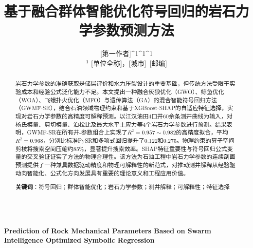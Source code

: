 \documentclass[a4paper,12pt]{ctexart}
\begin{document}
\title{\LARGE\textbf{基于融合群体智能优化符号回归的岩石力学参数预测方法}}
\author{
  {[第一作者]}^{1}\quad {[第二作者]}^{1}\quad {[第三作者]}^{1} \\[6pt]
  \small $^{1}$ [单位全称]，[城市]~[邮编]
}
\date{}
\maketitle

\begin{abstract}
岩石力学参数的准确获取是储层评价和水力压裂设计的重要基础，但传统方法受限于实验成本和经验公式泛化能力不足。本文提出一种融合灰狼优化（GWO）、鲸鱼优化（WOA）、飞蛾扑火优化（MFO）与遗传算法（GA）的混合智能符号回归方法（GWMF-SR），结合石油领域物理约束和基于XGBoost-SHAP的自适应特征选择，实现对岩石力学参数的高精度可解释预测。以江汉油田4口井60余条测井曲线为输入，对杨氏模量、剪切模量、泊松比及最大水平主应力等4个岩石力学参数进行预测。结果表明，GWMF-SR在所有井-参数组合上实现了$R^2=0.957\sim0.982$的高精度拟合，平均$R^2=0.968$，分别比标准PySR和多项式回归提升了0.122和0.275。物理约束的算子空间剪枝将搜索空间压缩约85\%，显著提升搜索效率。SHAP特征重要性与符号回归公式变量的交叉验证证实了方法的物理合理性。该方法为石油工程中岩石力学参数的连续剖面预测提供了一种兼具数据驱动精度和物理可解释性的新范式，对推动测井解释从经验驱动向智能化、公式化方向发展具有重要的理论意义和工程应用价值。

\noindent\textbf{关键词}：符号回归；群体智能优化；岩石力学参数；测井解释；可解释性；特征选择
\end{abstract}

\vspace{1em}
\noindent\rule{\textwidth}{0.4pt}
\vspace{0.5em}

{\noindent\large\textbf{Prediction of Rock Mechanical Parameters Based on Swarm Intelligence Optimized Symbolic Regression}}
\end{document}
